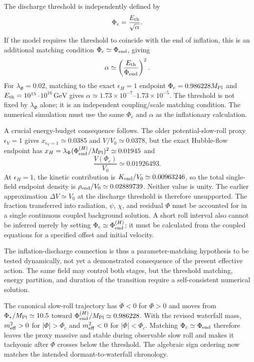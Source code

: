 \documentclass[epj]{svjour}
\begin{document}
The discharge threshold is independently defined by
\begin{equation}
\Phi_c=\frac{E_{\rm th}}{\sqrt{\alpha}}.
\end{equation}
If the model requires the threshold to coincide with the end of
inflation, this is an additional matching condition
\(\Phi_c\simeq\Phi_{\rm end}\), giving
\begin{equation}
\alpha\simeq\left(\frac{E_{\rm th}}{\Phi_{\rm end}}\right)^2.
\end{equation}
For \(\lambda_\Phi=0.02\), matching to the exact
$\epsilon_H=1$ endpoint $\Phi_c=0.986228M_{\rm Pl}$ and
$E_{\rm th}=10^{15}$--$10^{16}\,\mathrm{GeV}$ gives
$\alpha\simeq1.73\times10^{-7}$--$1.73\times10^{-5}$.
The threshold is not fixed by \(\lambda_\Phi\) alone; it is an
independent coupling/scale matching condition. The numerical
simulation must use the same \(\Phi_c\) and \(\alpha\) as the
inflationary calculation.

A crucial energy-budget consequence follows. The older
potential-slow-roll proxy $\epsilon_V=1$ gives
$x_{\epsilon_V=1}\simeq0.0385$ and
$V/V_0\simeq0.0378$, but the exact Hubble-flow endpoint has
$x_H=\lambda_\Phi(\Phi_{\rm end}^{(H)}/M_{\rm Pl})^2
\simeq0.01945$ and
\begin{equation}
\frac{V(\Phi_c)}{V_0}\simeq0.01926493.
\end{equation}
At $\epsilon_H=1$, the kinetic contribution is
$K_{\rm end}/V_0\simeq0.00963246$, so the total single-field
endpoint density is $\rho_{\rm end}/V_0\simeq0.02889739$.
Neither value is unity. The earlier approximation
$\Delta V\simeq V_0$ at the discharge threshold is therefore
unsupported. The fraction transferred into radiation, $\psi$,
$\chi$, and residual $\Phi$ must be accounted for in a single
continuous coupled background solution. A short roll interval also
cannot be inferred merely by setting
$\Phi_c\simeq\Phi_{\rm end}^{(H)}$; it must be calculated from
the coupled equations for a specified offset and initial velocity.

The inflation-discharge connection is thus a parameter-matching
hypothesis to be tested dynamically, not yet a demonstrated
consequence of the present effective action. The same field may
control both stages, but the threshold matching, energy partition,
and duration of the transition require a self-consistent numerical
solution.

The canonical slow-roll trajectory has $\dot\Phi<0$ for $\Phi>0$ and
moves from $\Phi_*/M_{\rm Pl}\simeq10.5$ toward
$\Phi_{\rm end}^{(H)}/M_{\rm Pl}\simeq0.986228$. With the revised waterfall
mass, $m_{\rm eff}^2>0$ for $|\Phi|>\Phi_c$ and
$m_{\rm eff}^2<0$ for $|\Phi|<\Phi_c$. Matching
$\Phi_c\simeq\Phi_{\rm end}$ therefore leaves the proxy massive and
stable during observable slow roll and makes it tachyonic after
$\Phi$ crosses below the threshold. The algebraic sign ordering now
matches the intended dormant-to-waterfall chronology.
\end{document}
